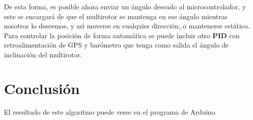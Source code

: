 \documentclass[journal]{IEEEtran}
\begin{document}
De esta forma, es posible ahora enviar un \'angulo deseado al microcontrolador, y este se encargar\'a de que el multirotor se mantenga en ese \'angulo mientras nosotros lo deseemos, y as{\'\i} moverse en cualquier direcci\'on, o mantenerse est\'atico. Para controlar la posici\'on de forma autom\'atica se puede incluir otro \textbf{PID} con retroalimentaci\'on de GPS y bar\'ometro que tenga como salida el \'angulo de inclinaci\'on del multirotor.

\section{Conclusi\'on}
El resultado de este algoritmo puede verse en el programa de Arduino.



\end{document}
